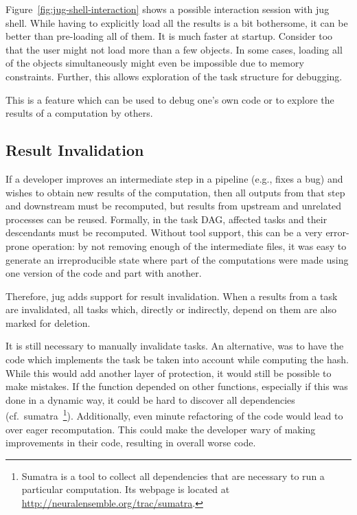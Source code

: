 \documentclass{article}
\begin{document}
Figure~\ref{fig:jug-shell-interaction} shows a possible interaction session
with jug shell. While having to explicitly load all the results is a bit
bothersome, it can be better than pre-loading all of them. It is much faster at
startup. Consider too that the user might not load more than a few objects. In
some cases, loading all of the objects simultaneously might even be impossible
due to memory constraints. Further, this allows exploration of the task
structure for debugging.

This is a feature which can be used to debug one's own code or to explore the
results of a computation by others.

\subsection{Result Invalidation}

If a developer improves an intermediate step in a pipeline (e.g., fixes a bug)
and wishes to obtain new results of the computation, then all outputs from that
step and downstream must be recomputed, but results from upstream and unrelated
processes can be reused. Formally, in the task DAG, affected tasks and their
descendants must be recomputed. Without tool support, this can be a very
error-prone operation: by not removing enough of the intermediate files, it was
easy to generate an irreproducible state where part of the computations were
made using one version of the code and part with another.

Therefore, jug adds support for result invalidation. When a results from a task
are invalidated, all tasks which, directly or indirectly, depend on them are
also marked for deletion.

It is still necessary to manually invalidate tasks. An alternative, was to have
the code which implements the task be taken into account while computing the
hash. While this would add another layer of protection, it would still be
possible to make mistakes. If the function depended on other functions,
especially if this was done in a dynamic way, it could be hard to discover all
dependencies (cf.\ sumatra~\footnote{Sumatra is a tool to collect all
dependencies that are necessary to run a particular computation. Its webpage is
located at \url{http://neuralensemble.org/trac/sumatra}.}). Additionally, even
minute refactoring of the code would lead to over eager recomputation. This
could make the developer wary of making improvements in their code, resulting
in overall worse code.
\end{document}
